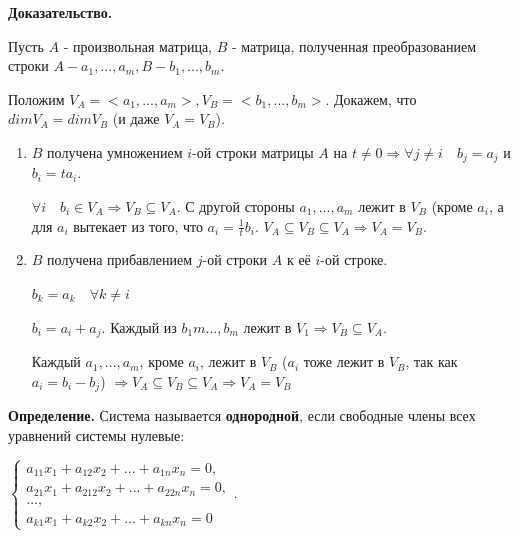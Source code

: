 \documentclass[a4paper]{article}
\begin{document}
\begin{hproof}
\textbf{Доказательство.} 

Пусть $A$ - произвольная матрица, $B$ - матрица, полученная преобразованием строки $A - a_1, ..., a_m, B - b_1, ..., b_m$.

Положим $V_A = <a_1, ..., a_m>, V_B = <b_1, ..., b_m>$. Докажем, что $dimV_A = dimV_B$ (и даже $V_A = V_B$).

\begin{enumerate}
\item $B$ получена умножением $i$-ой строки матрицы $A$ на $t \neq 0 \Rightarrow \forall j \neq i \quad b_j = a_j$ и $b_i = ta_i$.

$\forall i \quad b_i \in V_A \Rightarrow V_B \subseteq V_A$. С другой стороны $a_1, ..., a_m$ лежит в $V_B$ (кроме $a_i$, а для $a_i$ вытекает из того, что $\displaystyle a_i = \frac{1}{t} b_i$.  $V_A \subseteq V_B \subseteq V_A \Rightarrow V_A = V_B$.
\item $B$ получена прибавлением $j$-ой строки $A$ к её $i$-ой строке.

$b_k = a_k \quad \forall k \neq i$

$b_i = a_i+a_j$. Каждый из $b_1m ..., b_m$ лежит в $V_1 \Rightarrow V_B \subseteq V_A$.

Каждый $a_1, ..., a_m$, кроме $a_i$, лежит в $V_B$ ($a_i$ тоже лежит в $V_B$, так как \newline $a_i = b_i - b_j$) $\Rightarrow V_A \subseteq V_B \subseteq V_A \Rightarrow V_A=V_B$
\end{enumerate}
\end{hproof}

\newpage \begin{center}
                 \begin{Large}
                 \end{Large}
    \end{center}
    
   \textbf{Определение.} Система называется \textbf{однородной}, если свободные члены всех уравнений системы нулевые:
   
$\begin{cases}
a_{11}x_1 + a_{12}x_2 + ... + a_{1n}x_n = 0,
\\
a_{21}x_1 + a_{212}x_2 + ... + a_{22n}x_n = 0,
\\
...,
\\
a_{k1}x_1 + a_{k2}x_2 + ... + a_{kn}x_n = 0

\end{cases}$.
\end{document}

